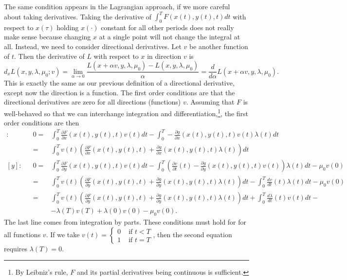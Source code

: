 The same condition appears in the Lagrangian approach, if we more
careful about taking derivatives. Taking the derivative of $\int_0^T
F(x(t),y(t),t) dt$ with respect to $x(\tau)$ holding $x(\cdot)$
constant for all other periods does not really make sense because
changing $x$ at a single point will not change the integral at
all. Instead, we need to consider directional derivatives. Let $v$ be
another function of $t$. Then the derivative of $L$ with respect to
$x$ in direction $v$ is
\[ d_xL(x,y,\lambda,\mu_0;v) = \lim_{\alpha \to 0} \frac{L(x + \alpha
  v, y, \lambda, \mu_0) - L(x,y,\lambda,\mu_0)}{\alpha} =
\frac{d}{d\alpha} L(x+\alpha v, y, \lambda, \mu_0). \] This is exactly
the same as our previous definition of a directional derivative,
except now the direction is a function. The first order conditions are
that the directional derivatives are zero for all directions
(functions) $v$. Assuming that $F$ is well-behaved so that we can
interchange integration and differentiation,\footnote{By Leibniz's
  rule, $F$ and its partial derivatives being continuous is
  sufficient.}, the first order conditions are then 
\begin{align*}
  [x]:&& 0 = & \int_0^T \frac{\partial F}{\partial x}(x(t),y(t),t) v(t) dt -
  \int_0^T -\frac{\partial g}{\partial x}(x(t),y(t),t) v(t) \lambda(t)
  dt \\ 
  && = & \int_0^T v(t) \left(\frac{\partial F}{\partial x}(x(t),y(t),t) +
    \frac{\partial g}{\partial x}(x(t),y(t),t) \lambda(t)\right) dt \\
  [y]:&& 0 = & \int_0^T \frac{\partial F}{\partial
    y}(x(t),y(t),t) v(t) dt - 
  \int_0^T \left(\frac{\partial v}{\partial t}(t) -\frac{\partial
      g}{\partial y}(x(t),y(t),t) v(t)\right) \lambda(t)  dt  - \mu_0v(0)\\
  && = & \int_0^T v(t) \left(\frac{\partial F}{\partial
      y}(x(t),y(t),t) + \frac{\partial g}{\partial y}(x(t),y(t),t)
    \lambda(t)  \right)dt - \int_0^T \frac{dv}{dt}(t)\lambda(t)
         dt  - \mu_0v(0)\\
  && = & \int_0^T v(t) \left(\frac{\partial F}{\partial
      y}(x(t),y(t),t) + \frac{\partial g}{\partial y}(x(t),y(t),t)
    \lambda(t)  \right)dt + \int_0^T \frac{d\lambda}{dt}(t)v(t)dt -
  \\ 
  &&  & - \lambda(T)v(T) + \lambda(0)v(0)  - \mu_0v(0).
\end{align*}
The last line comes from integration by parts.  These conditions must
hold for for all functions $v$. If we take $v(t) = \begin{cases} 0 &
  \text{ if  }t<T\\
  1 & \text{ if } t=T \end{cases}$, then the second equation requires
$\lambda(T)=0$.

